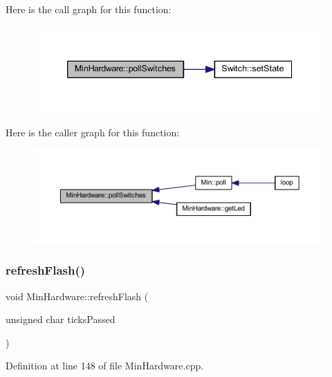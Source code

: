 Here is the call graph for this function\+:
\nopagebreak
\begin{figure}[H]
\begin{center}
\leavevmode
\includegraphics[width=339pt]{d0/d93/class_min_hardware_a135650ade19c661a9e20f0a410722a10_cgraph}
\end{center}
\end{figure}
Here is the caller graph for this function\+:
\nopagebreak
\begin{figure}[H]
\begin{center}
\leavevmode
\includegraphics[width=350pt]{d0/d93/class_min_hardware_a135650ade19c661a9e20f0a410722a10_icgraph}
\end{center}
\end{figure}
\mbox{\label{class_min_hardware_a22017d021942bf72850a338b1522d5c2}} 
\subsubsection{\texorpdfstring{refresh\+Flash()}{refreshFlash()}}
{\footnotesize\ttfamily void Min\+Hardware\+::refresh\+Flash (\begin{DoxyParamCaption}\item[{unsigned char}]{ticks\+Passed }\end{DoxyParamCaption})}



Definition at line 148 of file Min\+Hardware.\+cpp.

